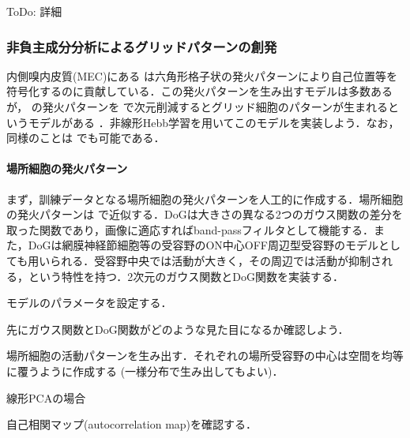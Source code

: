 ToDo: 詳細
\subsubsection{非負主成分分析によるグリッドパターンの創発}
内側嗅内皮質(MEC)にある\textbf{} は六角形格子状の発火パターンにより自己位置等を符号化するのに貢献している．この発火パターンを生み出すモデルは多数あるが，\textbf{} の発火パターンを\textbf{} で次元削減するとグリッド細胞のパターンが生まれるというモデルがある \cite{Dordek2016-ff}．非線形Hebb学習を用いてこのモデルを実装しよう．なお，同様のことは\textbf{} でも可能である．
\paragraph{場所細胞の発火パターン}
まず，訓練データとなる場所細胞の発火パターンを人工的に作成する．場所細胞の発火パターンは\textbf{} で近似する．DoGは大きさの異なる2つのガウス関数の差分を取った関数であり，画像に適応すればband-passフィルタとして機能する．また，DoGは網膜神経節細胞等の受容野のON中心OFF周辺型受容野のモデルとしても用いられる．受容野中央では活動が大きく，その周辺では活動が抑制される，という特性を持つ．2次元のガウス関数とDoG関数を実装する．

モデルのパラメータを設定する．

先にガウス関数とDoG関数がどのような見た目になるか確認しよう．



場所細胞の活動パターンを生み出す．それぞれの場所受容野の中心は空間を均等に覆うように作成する (一様分布で生み出してもよい)．

線形PCAの場合



自己相関マップ(autocorrelation map)を確認する．

